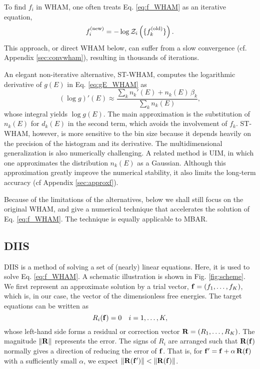 \documentclass[reprint,aip,jcp,superscriptaddress]{revtex4-1}
\begin{document}
To find $f_i$ in WHAM,
one often treats Eq. \eqref{eq:f_WHAM}
as an iterative equation,
%
\begin{equation*}
f_i^\mathrm{(new)}
=
-\log \mathcal{Z}_i\left(
  \{ f_k^\mathrm{(old)} \}
\right).
\end{equation*}
%
This approach, or direct WHAM below,
can suffer from a slow convergence
(cf. Appendix \ref{sec:convwham}),
resulting in thousands of iterations\cite{
bereau2009, kim2011}.



An elegant non-iterative alternative, ST-WHAM,
computes the logarithmic derivative of $g(E)$
in Eq. \eqref{eq:gE_WHAM} as\cite{
kim2011}
%
\begin{equation}
(\log g)'(E)
\approx
\frac{
  \sum_k n_k'(E) + n_k(E) \, \beta_k
}
{
  \sum_k n_k(E)
},
\label{eq:beta_STWHAM}
\end{equation}
%
whose integral yields $\log g(E)$.
%
The main approximation is
the substitution of $n_k(E)$
for $d_k(E)$ in the second term,
which avoids the involvement of $f_k$.
%
ST-WHAM, however,
is more sensitive to the bin size
because it depends heavily on
the precision of the histogram
and its derivative.
%
The multidimensional generalization
is also numerically challenging\cite{
kim2011}.
%
A related method is UIM\cite{
kastner2005, *kastner2009},
in which one approximates
the distribution $n_k(E)$ as a Gaussian.
%
Although this approximation
greatly improve the numerical stability,
it also limits the long-term
accuracy (cf Appendix \ref{sec:approxf}).



Because of the limitations of the alternatives,
below we shall still focus on the original WHAM,
and give a numerical technique
that accelerates the solution
of Eq. \eqref{eq:f_WHAM}.
%
The technique is equally applicable to MBAR.





\subsection{DIIS}



DIIS is a method of solving a set of
(nearly) linear equations\cite{
pulay1980, *pulay1982, *hamilton1986,
kovalenko1999, howard2011}.
%
Here, it is used
to solve Eq. \eqref{eq:f_WHAM}.
%
A schematic illustration
is shown in Fig. \ref{fig:scheme}.
%
We first represent an approximate solution
by a trial vector,
$\mathbf{f} = (f_1, \dots, f_K)$,
which is, in our case, the vector of
the dimensionless free energies.
%
The target equations can be written as
%
\begin{equation}
  R_i(\mathbf{f}) = 0  \quad i = 1, \ldots, K,
  \label{eq:R_f}
\end{equation}
%
whose left-hand side forms
a residual or correction vector
$\mathbf{R} = (R_1, \dots, R_K)$.
%
The magnitude
$\| \mathbf{R} \|$
represents the error.
%
The signs of $R_i$ are arranged such that
$\mathbf{R}(\mathbf{f})$
normally gives a direction
of reducing the error of $\mathbf{f}$.
%
That is,
for $\mathbf{f}' = \mathbf{f} + \alpha \, \mathbf{R}(\mathbf{f})$
with a sufficiently small $\alpha$,
we expect
%
$\| \mathbf{R}(\mathbf{f}') \| < \| \mathbf{R}(\mathbf{f}) \|$.
\end{document}
